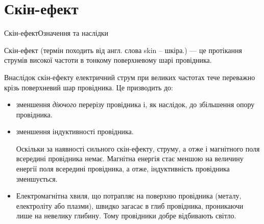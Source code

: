 \documentclass[onlytextwidth]{beamer}
\begin{document}
\section{Скін-ефект}

\begin{frame}{Скін-ефект}{Означення та наслідки}
	\begin{block}{}\justifying
		Скін-ефект (термін походить від англ. слова skin -- шкіра.) --- це протікання струмів високої частоти в тонкому
		поверхневому шарі провідника.
	\end{block}
	\begin{center}
		
	\end{center}
	\begin{block}{}\justifying\small
		Внаслідок скін-ефекту електричний струм при великих частотах тече переважно крізь поверхневий шар провідника. Це призводить до:
		\begin{itemize}\justifying
			\item зменшення  \emph{діючого} перерізу провідника і, як наслідок, до \alert{збільшення опору провідника}.
			\item зменшення  індуктивності провідника.

			      {\scriptsize Оскільки за наявності сильного скін-ефекту, струму, а отже і магнітного поля всередині
			      провідника немає. Магнітна енергія стає меншою на величину енергії поля всередині провідника, а отже,
			      \alert{індуктивність провідника
				      зменшується}.}

			\item Електромагнітна хвиля, що потрапляє на поверхню провідника (металу, електроліту або плазми),
			      швидко загасає в глиб провідника,
			      проникаючи лише на невелику глибину. Тому \alert{провідники добре відбивають світло}.
		\end{itemize}
	\end{block}
\end{frame}
\end{document}
